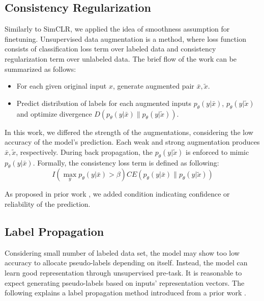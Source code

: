 \documentclass[10pt,twocolumn,letterpaper]{article}
\begin{document}
	
	
	\subsection{Consistency Regularization}
	
	Similarly to SimCLR, we applied the idea of smoothness assumption for finetuning. Unsupervised data augmentation \cite {Xie2020} is a method, where loss function consists of classification loss term over labeled data and consistency regularization term over unlabeled data. The brief flow of the work can be summarized as follows:
	\begin{itemize}
		\item For each given original input $x$, generate augmented pair $\bar{x}, \tilde{x}$.
		\item Predict distribution of labels for each augmented inputs $p_\theta\left(y|\bar{x}\right)$, $p_\theta\left(y|\tilde{x}\right)$ and optimize divergence $D\left(p_\theta\left(y|\bar{x}\right) \parallel p_\theta\left(y|\tilde{x}\right)\right)$.
	\end{itemize}
	In this work, we differed the strength of the augmentations, considering the low accuracy of the model's prediction. Each weak and strong augmentation produces $\bar{x}, \tilde{x}$, respectively. During back propagation, the $p_\theta\left(y|\tilde{x}\right)$ is enforced to mimic $p_\theta\left(y|\bar{x}\right)$. Formally, the consistency loss term is defined as following:
	\begin{equation}
		I\left(\max_y p_\theta\left(y|\bar{x}\right) > \beta\right) CE \left(p_\theta\left(y|\bar{x}\right)\parallel p_\theta\left(y|\tilde{x}\right)\right)
	\end{equation}
	
	As proposed in prior work \cite{Xie2020}, we added condition indicating confidence or reliability of the prediction. 
	
	\subsection{Label Propagation}
	
	Considering small number of labeled data set, the model may show too low accuracy to allocate pseudo-labels depending on itself. Instead, the model can learn good representation through unsupervised pre-task. It is reasonable to expect generating pseudo-labels based on inputs' representation vectors. The following explains a  label propagation method introduced from a prior work \cite{Iscen2019}.
	
\end{document}
